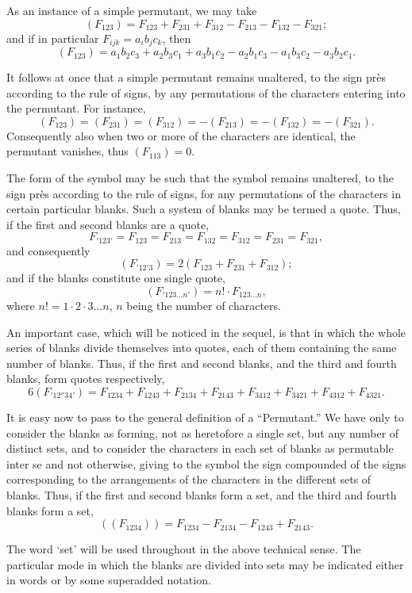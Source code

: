 \documentclass[11pt,a4paper]{book}
\begin{document}
As an instance of a simple permutant, we may take
\[(F_{123}) = F_{123} + F_{231} + F_{312} - F_{213} - F_{132} - F_{321};\]
and if in particular $F_{ijk} = a_i b_j c_k$, then
\[(F_{123}) = a_1 b_2 c_3 + a_2 b_3 c_1 + a_3 b_1 c_2 - a_2 b_1 c_3 - a_1 b_3 c_2 - a_3 b_2 c_1.\]

It follows at once that a simple permutant remains unaltered, to the sign pr\`{e}s according to the rule of signs, by any permutations of the characters entering into the permutant. For instance,
\[(F_{123}) = (F_{231}) = (F_{312}) = -(F_{213}) = -(F_{132}) = -(F_{321}).\]
Consequently also when two or more of the characters are identical, the permutant vanishes, thus $(F_{113}) = 0$.

The form of the symbol may be such that the symbol remains unaltered, to the sign pr\`{e}s according to the rule of signs, for any permutations of the characters in certain particular blanks. Such a system of blanks may be termed a quote. Thus, if the first and second blanks are a quote,
\[F_{'123'} = F_{123} = F_{213} = F_{132} = F_{312} = F_{231} = F_{321},\]
and consequently
\[(F_{'12'3}) = 2(F_{123} + F_{231} + F_{312});\]
and if the blanks constitute one single quote,
\[(F_{'123\ldots n'}) = n! \cdot F_{123\ldots n},\]
where $n! = 1 \cdot 2 \cdot 3 \ldots n$, $n$ being the number of characters.

An important case, which will be noticed in the sequel, is that in which the whole series of blanks divide themselves into quotes, each of them containing the same number of blanks. Thus, if the first and second blanks, and the third and fourth blanks, form quotes respectively,
\[6(F_{'12''34'}) = F_{1234} + F_{1243} + F_{2134} + F_{2143} + F_{3412} + F_{3421} + F_{4312} + F_{4321}.\]

It is easy now to pass to the general definition of a ``Permutant.'' We have only to consider the blanks as forming, not as heretofore a single set, but any number of distinct sets, and to consider the characters in each set of blanks as permutable inter se and not otherwise, giving to the symbol the sign compounded of the signs corresponding to the arrangements of the characters in the different sets of blanks. Thus, if the first and second blanks form a set, and the third and fourth blanks form a set,
\[((F_{1234})) = F_{1234} - F_{2134} - F_{1243} + F_{2143}.\]

The word `set' will be used throughout in the above technical sense. The particular mode in which the blanks are divided into sets may be indicated either in words or by some superadded notation.
\end{document}
